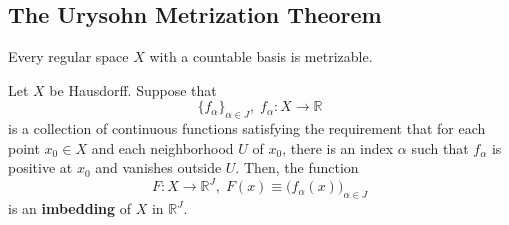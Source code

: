   \subsection{The Urysohn Metrization Theorem}

    \begin{theorem}
      Every regular space $X$ with a countable basis is metrizable. 
    \end{theorem}

    \begin{theorem}
      Let $X$ be Hausdorff. Suppose that 
      \begin{equation}
        \{f_\alpha\}_{\alpha \in J}, \; f_\alpha: X \longrightarrow \mathbb{R}
      \end{equation}
      is a collection of continuous functions satisfying the requirement that for each point $x_0 \in X$ and each neighborhood $U$ of $x_0$, there is an index $\alpha$ such that $f_\alpha$ is positive at $x_0$ and vanishes outside $U$. Then, the function 
      \begin{equation}
        F: X \longrightarrow \mathbb{R}^J, \; F(x) \equiv \big( f_\alpha (x)\big)_{\alpha \in J}
      \end{equation}
      is an \textbf{imbedding} of $X$ in $\mathbb{R}^J$.
    \end{theorem}

